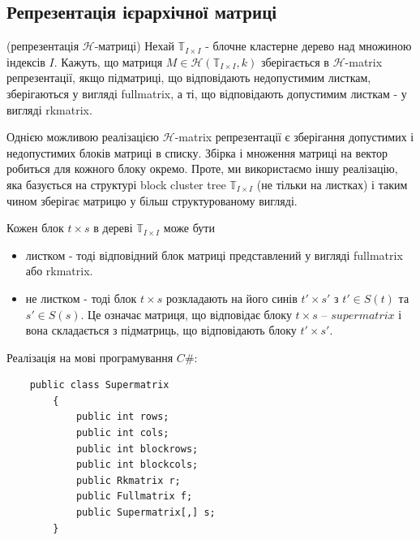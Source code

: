 \documentclass[12pt]{report}
\begin{document}
	\subsection{Репрезентація ієрархічної матриці}
	\begin{Def}
		(репрезентація $\mathcal{H}$-матриці)  Нехай $\mathbb{T}_{I\times I}$ - блочне кластерне дерево над множиною індексів $I$. Кажуть, що матриця $M\in\mathcal{H}(\mathbb{T}_{I\times I},k)$ зберігається в $\mathcal{H}$-matrix репрезентації, якщо підматриці, що відповідають недопустимим листкам, зберігаються у вигляді fullmatrix, а ті, що відповідають допустимим листкам - у вигляді rkmatrix. 
	\end{Def}
	\par Однією можливою реалізацією $\mathcal{H}$-matrix репрезентації є зберігання допустимих і недопустимих блоків матриці в списку. Збірка і множення матриці на вектор робиться для кожного блоку окремо. Проте, ми використаємо іншу реалізацію, яка базується на структурі block cluster tree $\mathbb{T}_{I\times I}$ (не тільки на листках) і таким чином зберігає матрицю у більш структурованому вигляді.
	\par Кожен блок $t\times s$ в дереві $\mathbb{T}_{I\times I}$ може бути 
	\begin{itemize}
		\item листком - тоді відповідний блок матриці представлений у вигляді fullmatrix або rkmatrix.
		\item не листком - тоді блок $t\times s$ розкладають на його синів $t'\times s'$ з $t'\in S(t)$ та $s' \in S(s)$. Це означає матриця, що відповідає блоку $t\times s$ -- $supermatrix$ і вона складається з підматриць, що відповідають блоку $t'\times s'$.
	\end{itemize} 
	\par Реалізація на мові програмування $C\#$:
	\begin{verbatim}
	public class Supermatrix
	    {
	        public int rows;
	        public int cols;
	        public int blockrows;
	        public int blockcols;
	        public Rkmatrix r;
	        public Fullmatrix f;
	        public Supermatrix[,] s;
	    }
	\end{verbatim}
\end{document}
